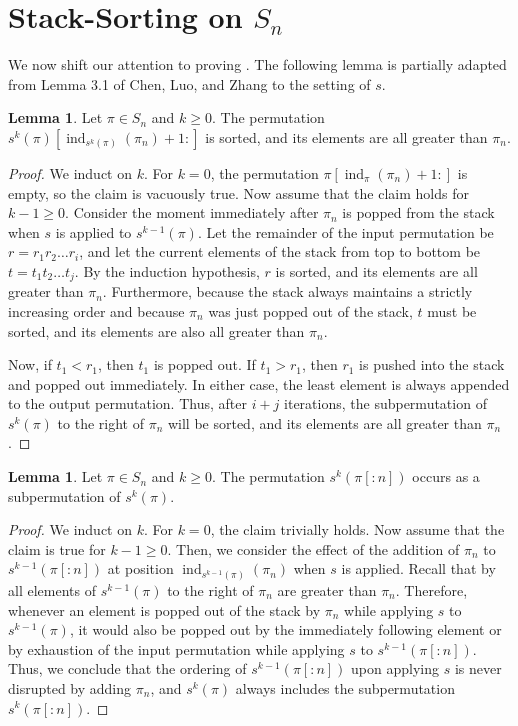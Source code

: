 \documentclass[12pt]{amsart}
\DeclareMathOperator{\ind}{ind}
\theoremstyle{definition}
\newtheorem{lemma}[theorem]{Lemma}
\begin{document}
\section{Stack-Sorting on $S_n$}
We now shift our attention to proving . The following lemma is partially adapted from Lemma 3.1 of Chen, Luo, and Zhang \cite{words} to the setting of $s$.
\begin{lemma}\label{lem:increasingtail}
Let $\pi\in S_n$ and $k\ge 0$. The permutation $s^k(\pi)[\ind_{s^k(\pi)}(\pi_n)+1:]$ is sorted, and its elements are all greater than $\pi_n$.
\end{lemma}
\begin{proof}
We induct on $k$. For $k= 0$, the permutation $\pi[\ind_{\pi}(\pi_n)+1:]$ is empty, so the claim is vacuously true. Now assume that the claim holds for $k-1\ge 0$. Consider the moment immediately after $\pi_n$ is popped from the stack when $s$ is applied to $s^{k-1}(\pi)$. Let the remainder of the input permutation be $r = r_1r_2\dots r_i$, and let the current elements of the stack from top to bottom be $t=t_1t_2\dots t_j$. By the induction hypothesis, $r$ is sorted, and its elements are all greater than $\pi_n$. Furthermore, because the stack always maintains a strictly increasing order and because $\pi_n$ was just popped out of the stack, $t$ must be sorted, and its elements are also all greater than $\pi_n$.

Now, if $t_1 < r_1$, then $t_1$ is popped out. If $t_1 > r_1$, then $r_1$ is pushed into the stack and popped out immediately. In either case, the least element is always appended to the output permutation. Thus, after $i+j$ iterations, the subpermutation of $s^k(\pi)$ to the right of $\pi_n$ will be sorted, and its elements are all greater than $\pi_n$.
\end{proof}
\begin{lemma}\label{lem:excludinglast}
Let $\pi\in S_n$ and $k\ge 0$. The permutation $s^k(\pi[:n])$ occurs as a subpermutation of $s^k(\pi)$.
\end{lemma}
\begin{proof}
We induct on $k$. For $k=0$, the claim trivially holds. Now assume that the claim is true for $k-1\ge0$. Then, we consider the effect of the addition of $\pi_n$ to $s^{k-1}(\pi[:n])$ at position $\ind_{s^{k-1}(\pi)}(\pi_n)$ when $s$ is applied. Recall that by  all elements of $s^{k-1}(\pi)$ to the right of $\pi_n$ are greater than $\pi_n$. Therefore, whenever an element is popped out of the stack by $\pi_n$ while applying $s$ to $s^{k-1}(\pi)$, it would also be popped out by the immediately following element or by exhaustion of the input permutation while applying $s$ to $s^{k-1}(\pi[:n])$. Thus, we conclude that the ordering of $s^{k-1}({\pi[:n]})$ upon applying $s$ is never disrupted by adding $\pi_n$, and $s^k(\pi)$ always includes the subpermutation $s^k(\pi[:n])$.
\end{proof}
\end{document}
